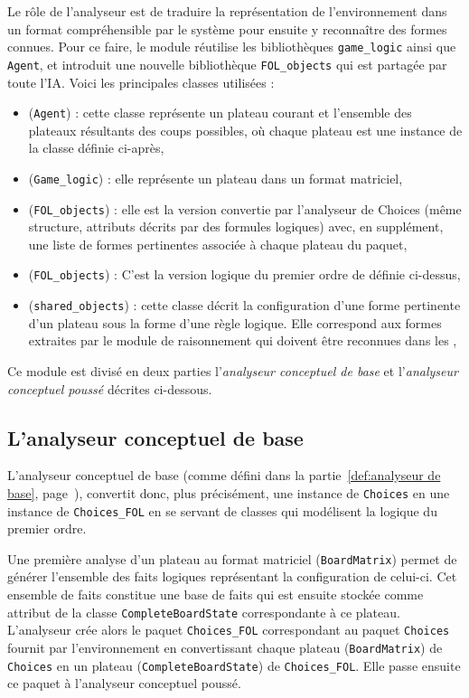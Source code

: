Le rôle de l'analyseur est de traduire la représentation de l'environnement dans un format compréhensible par le système pour ensuite y reconnaître des formes connues. Pour ce faire, le module réutilise les bibliothèques \texttt{game\_logic} ainsi que \texttt{Agent}, et introduit une nouvelle bibliothèque \texttt{FOL\_objects} qui est partagée par toute l'IA. Voici les principales classes utilisées :

\begin{itemize}
  \item {} (\texttt{Agent}) : cette classe représente un plateau courant et l'ensemble des plateaux résultants des coups possibles, où chaque plateau est une instance de la classe  définie ci-après,
  \item {} (\texttt{Game\_logic}) : elle représente un plateau dans un format matriciel,
  \item {} (\texttt{FOL\_objects}) : elle est la version convertie par l'analyseur de Choices (même structure, attributs décrits par des formules logiques) avec, en supplément, une liste de formes pertinentes associée à chaque plateau du paquet,
  \item {} (\texttt{FOL\_objects}) : C'est la version logique du premier ordre de
   définie ci-dessus,
  \item {} (\texttt{shared\_objects}) : cette classe décrit la configuration d'une forme pertinente d'un plateau sous la forme d'une règle logique. Elle correspond aux formes extraites par le module de raisonnement qui doivent être reconnues dans les ,
\end{itemize}

Ce module est divisé en deux parties l'\emph{analyseur conceptuel de base} et l'\emph{analyseur conceptuel poussé} décrites ci-dessous.
 
\subsection{L'analyseur conceptuel de base}
L'analyseur conceptuel de base (comme défini dans la partie~\ref{def:analyseur de base}, page~\pageref{def:analyseur de base}), convertit donc, plus précisément, une instance de \texttt{Choices} en une instance de \texttt{Choices\_FOL} en se servant de classes qui modélisent la logique du premier ordre. 

Une première analyse d'un plateau au format matriciel (\texttt{BoardMatrix}) permet de générer l'ensemble des faits logiques représentant la configuration de celui-ci. Cet ensemble de faits constitue une base de faits qui est ensuite stockée comme attribut de la classe \texttt{CompleteBoardState} correspondante à ce plateau. L'analyseur crée alors le paquet \texttt{Choices\_FOL} correspondant au paquet \texttt{Choices} fournit par l'environnement en convertissant chaque plateau (\texttt{BoardMatrix}) de \texttt{Choices} en un plateau (\texttt{CompleteBoardState}) de \texttt{Choices\_FOL}. Elle passe ensuite ce paquet à l'analyseur conceptuel poussé. 
